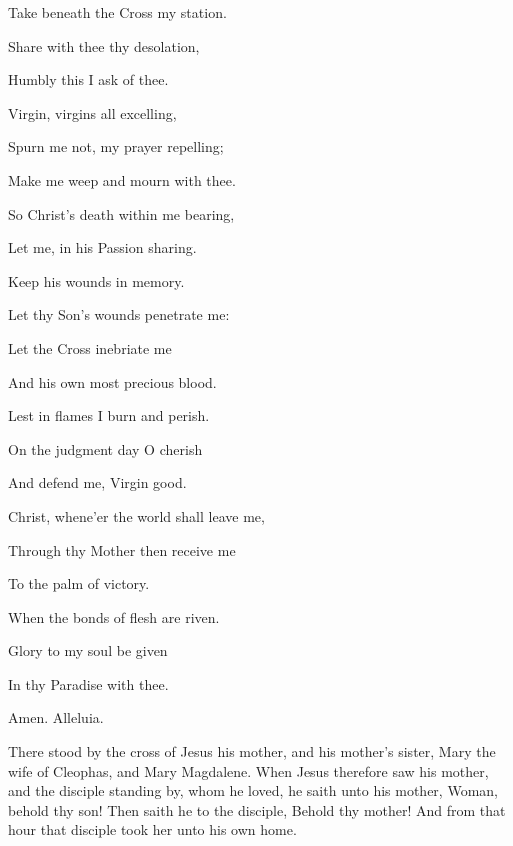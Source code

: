 \begin{multicols}{2}
\begin{hangparas}{1.25em}{1}
\vspace{0.75\baselineskip}

Take beneath the Cross my station.

Share with thee thy desolation,

Humbly this I ask of thee.%

\vspace{0.75\baselineskip}

Virgin, virgins all excelling,

Spurn me not, my prayer repelling;

Make me weep and mourn with thee.%

\vspace{0.75\baselineskip}

So Christ's death within me bearing,

Let me, in his Passion sharing.

Keep his wounds in memory.%

\vspace{0.75\baselineskip}

Let thy Son's wounds penetrate me:

Let the Cross inebriate me

And his own most precious blood.%

\vspace{0.75\baselineskip}

Lest in flames I burn and perish.

On the judgment day O cherish

And defend me, Virgin good.%

\vspace{0.75\baselineskip}

Christ, whene'er the world shall leave me,

Through thy Mother then receive me

To the palm of victory.%

\vspace{0.75\baselineskip}

When the bonds of flesh are riven.

Glory to my soul be given

In thy Paradise with thee.

Amen. Alleluia.
\end{hangparas}
\end{multicols}
 There stood by the cross of Jesus his mother, and his mother's sister, Mary the wife of Cleophas, and Mary Magdalene. When Jesus therefore saw his mother, and the disciple standing by, whom he loved, he saith unto his mother, Woman, behold thy son! Then saith he to the disciple, Behold thy mother! And from that hour that disciple took her unto his own home.

